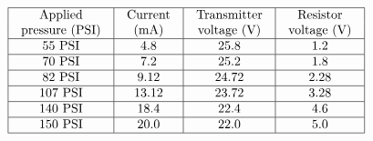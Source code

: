 
$$\vbox{\offinterlineskip
\halign{\strut
\vrule \quad\hfil # \ \hfil & 
\vrule \quad\hfil # \ \hfil & 
\vrule \quad\hfil # \ \hfil & 
\vrule \quad\hfil # \ \hfil \vrule \cr
\noalign{\hrule}
%
Applied & Current & Transmitter & Resistor \cr
%
pressure (PSI) & (mA) & voltage (V) & voltage (V) \cr
%
\noalign{\hrule}
%
55 PSI & 4.8 & 25.8 & 1.2 \cr
%
\noalign{\hrule}
%
70 PSI & 7.2 & 25.2 & 1.8 \cr
%
\noalign{\hrule}
%
82 PSI & 9.12 & 24.72 & 2.28 \cr
%
\noalign{\hrule}
%
107 PSI & 13.12 & 23.72 & 3.28 \cr
%
\noalign{\hrule}
%
140 PSI & 18.4 & 22.4 & 4.6 \cr
%
\noalign{\hrule}
%
150 PSI & 20.0 & 22.0 & 5.0 \cr
%
\noalign{\hrule}
} %
}$$ %





